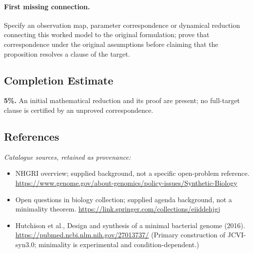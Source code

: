 \documentclass[11pt]{article}
\begin{document}
\paragraph{First missing connection.} Specify an observation map, parameter correspondence or dynamical reduction connecting this worked model to the original formulation; prove that correspondence under the original assumptions before claiming that the proposition resolves a clause of the target.
\subsection{Completion Estimate}
\textbf{5\%.} An initial mathematical reduction and its proof are present; no full-target clause is certified by an unproved correspondence.
\subsection{References}
\noindent\emph{Catalogue sources, retained as provenance:}
\begin{itemize}
\item NHGRI overview; supplied background, not a specific open-problem reference. \url{https://www.genome.gov/about-genomics/policy-issues/Synthetic-Biology}
\item Open questions in biology collection; supplied agenda background, not a minimality theorem. \url{https://link.springer.com/collections/eiiddehjgj}
\item Hutchison et al., Design and synthesis of a minimal bacterial genome (2016). \url{https://pubmed.ncbi.nlm.nih.gov/27013737/} (Primary construction of JCVI-syn3.0; minimality is experimental and condition-dependent.)
\end{itemize}
\clearpage


\appendix
\end{document}
